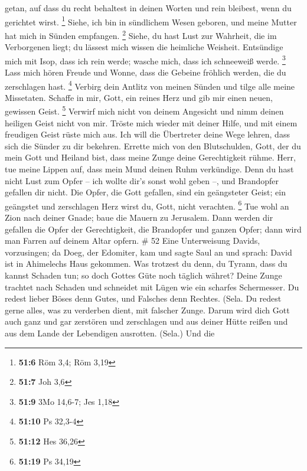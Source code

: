 getan, auf dass du recht behaltest in deinen Worten und rein bleibest,
wenn du gerichtet wirst. \footnote{\textbf{51:6} Röm 3,4; Röm 3,19}
 Siehe, ich bin in sündlichem Wesen geboren, und meine
Mutter hat mich in Sünden empfangen. \footnote{\textbf{51:7} Joh 3,6}
 Siehe, du hast Lust zur Wahrheit, die im Verborgenen liegt;
du lässest mich wissen die heimliche Weisheit.  Entsündige
mich mit Isop, dass ich rein werde; wasche mich, dass ich schneeweiß
werde. \footnote{\textbf{51:9} 3Mo 14,6-7; Jes 1,18}  Lass
mich hören Freude und Wonne, dass die Gebeine fröhlich werden, die du
zerschlagen hast. \footnote{\textbf{51:10} Ps 32,3-4} 
Verbirg dein Antlitz von meinen Sünden und tilge alle meine Missetaten.
 Schaffe in mir, Gott, ein reines Herz und gib mir einen
neuen, gewissen Geist. \footnote{\textbf{51:12} Hes 36,26} 
Verwirf mich nicht von deinem Angesicht und nimm deinen heiligen Geist
nicht von mir.  Tröste mich wieder mit deiner Hilfe, und
mit einem freudigen Geist rüste mich aus.  Ich will die
Übertreter deine Wege lehren, dass sich die Sünder zu dir bekehren.
 Errette mich von den Blutschulden, Gott, der du mein Gott
und Heiland bist, dass meine Zunge deine Gerechtigkeit rühme.
 Herr, tue meine Lippen auf, dass mein Mund deinen Ruhm
verkündige.  Denn du hast nicht Lust zum Opfer -- ich
wollte dir's sonst wohl geben --, und Brandopfer gefallen dir nicht.
 Die Opfer, die Gott gefallen, sind ein geängsteter Geist;
ein geängstet und zerschlagen Herz wirst du, Gott, nicht verachten.
\footnote{\textbf{51:19} Ps 34,19}  Tue wohl an Zion nach
deiner Gnade; baue die Mauern zu Jerusalem.  Dann werden
dir gefallen die Opfer der Gerechtigkeit, die Brandopfer und ganzen
Opfer; dann wird man Farren auf deinem Altar opfern. \# 52 
Eine Unterweisung Davids, vorzusingen;  da Doeg, der
Edomiter, kam und sagte Saul an und sprach: David ist in Ahimelechs Haus
gekommen.  Was trotzest du denn, du Tyrann, dass du kannst
Schaden tun; so doch Gottes Güte noch täglich währet?  Deine
Zunge trachtet nach Schaden und schneidet mit Lügen wie ein scharfes
Schermesser.  Du redest lieber Böses denn Gutes, und
Falsches denn Rechtes. (Sela.  Du redest gerne alles, was zu
verderben dient, mit falscher Zunge.  Darum wird dich Gott
auch ganz und gar zerstören und zerschlagen und aus deiner Hütte reißen
und aus dem Lande der Lebendigen ausrotten. (Sela.)  Und die

